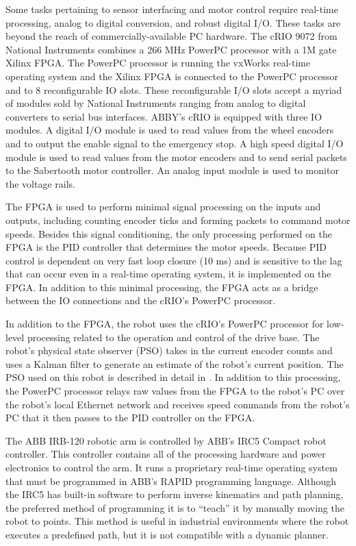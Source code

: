 \documentclass[]{cwru} %
\begin{document}
Some tasks pertaining to sensor interfacing and motor control require
real-time processing, analog to digital conversion, and robust digital
I/O. These tasks are beyond the reach of commercially-available PC
hardware. The cRIO 9072 from National Instruments combines a 266 MHz
PowerPC processor with a 1M gate Xilinx FPGA. The PowerPC processor is
running the vxWorks real-time operating system and the Xilinx FPGA is
connected to the PowerPC processor and to 8 reconfigurable IO slots.
These reconfigurable I/O slots accept a myriad of modules sold by
National Instruments ranging from analog to digital converters to serial
bus interfaces. ABBY's cRIO is equipped with three IO modules. A digital
I/O module is used to read values from the wheel encoders and to output
the enable signal to the emergency stop. A high speed digital I/O module
is used to read values from the motor encoders and to send serial
packets to the Sabertooth motor controller. An analog input module is
used to monitor the voltage rails.

The FPGA is used to perform minimal signal processing on the inputs and
outputs, including counting encoder ticks and forming packets to command
motor speeds. Besides this signal conditioning, the only processing
performed on the FPGA is the PID controller that determines the motor
speeds. Because PID control is dependent on very fast loop closure (10
ms) and is sensitive to the lag that can occur even in a real-time
operating system, it is implemented on the FPGA. In addition to this
minimal processing, the FPGA acts as a bridge between the IO connections
and the cRIO's PowerPC processor.

In addition to the FPGA, the robot uses the cRIO's PowerPC processor for
low-level processing related to the operation and control of the drive
base. The robot's physical state observer (PSO) takes in the current
encoder counts and uses a Kalman filter to generate an estimate of the
robot's current position. The PSO used on this robot is described in
detail in \cite{perko}. In addition to this processing, the PowerPC
processor relays raw values from the FPGA to the robot's PC over the
robot's local Ethernet network and receives speed commands from the
robot's PC that it then passes to the PID controller on the FPGA.

The ABB IRB-120 robotic arm is controlled by ABB's IRC5 Compact robot
controller. This controller contains all of the processing hardware and
power electronics to control the arm. It runs a proprietary real-time
operating system that must be programmed in ABB's RAPID programming
language. Although the IRC5 has built-in software to perform inverse
kinematics and path planning, the preferred method of programming it is
to ``teach'' it by manually moving the robot to points. This method is
useful in industrial environments where the robot executes a predefined
path, but it is not compatible with a dynamic planner.
\end{document}
